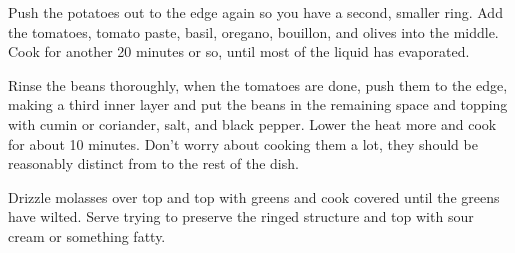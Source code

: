 \documentclass[12pt, twoside]{amsart}
\begin{document}
{\begin{directions}
\item Push the potatoes out to the edge again so you have a second, smaller ring. Add the tomatoes, tomato paste, basil, oregano, bouillon, and olives into the middle. Cook for another 20 minutes or so, until most of the liquid has evaporated.
\item Rinse the beans thoroughly, when the tomatoes are done, push them to the edge, making a third inner layer and put the beans in the remaining space and topping with cumin or coriander, salt, and black pepper. Lower the heat more and cook for about 10 minutes. Don't worry about cooking them a lot, they should be reasonably distinct from to the rest of the dish.
\item Drizzle molasses over top and top with greens and cook covered until the greens have wilted. Serve trying to preserve the ringed structure and top with sour cream or something fatty.
\end{directions}
}
\end{document}
